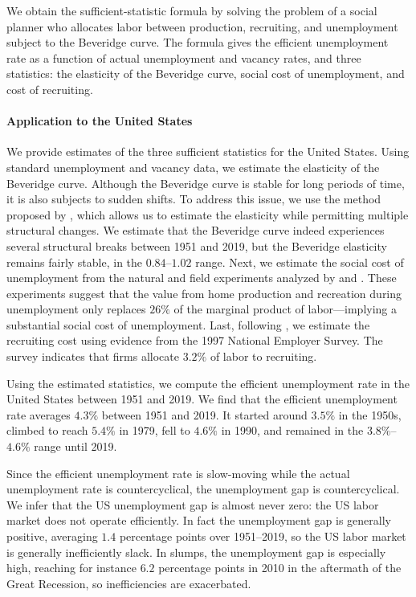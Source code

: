 \documentclass[letterpaper,12pt,leqno]{article}
\begin{document}
We obtain the sufficient-statistic formula by solving the problem of a social planner who allocates labor between production, recruiting, and unemployment subject to the Beveridge curve. The formula gives the efficient unemployment rate as a function of actual unemployment and vacancy rates, and three statistics: the elasticity of the Beveridge curve, social cost of unemployment, and cost of recruiting.

\paragraph{Application to the United States} We provide estimates of the three sufficient statistics for the United States. Using standard unemployment and vacancy data, we estimate the elasticity of the Beveridge curve. Although the Beveridge curve is stable for long periods of time, it is also subjects to sudden shifts. To address this issue, we use the method proposed by , which allows us to estimate the elasticity while permitting multiple structural changes. We estimate that the Beveridge curve indeed experiences several structural breaks between 1951 and 2019, but the Beveridge elasticity remains fairly stable, in the $0.84$--$1.02$ range. Next, we estimate the social cost of unemployment from the natural and field experiments analyzed by  and . These experiments suggest that the value from home production and recreation during unemployment only replaces $26\%$ of the marginal product of labor---implying a substantial social cost of unemployment. Last, following , we estimate the recruiting cost using evidence from the 1997 National Employer Survey. The survey indicates that firms allocate $3.2\%$ of labor to recruiting.

Using the estimated statistics, we compute the efficient unemployment rate in the United States between 1951 and 2019. We find that the efficient unemployment rate averages $4.3\%$ between 1951 and 2019. It started around $3.5\%$ in the 1950s, climbed to reach $5.4\%$ in 1979, fell to $4.6\%$ in 1990, and remained in the $3.8\%$--$4.6\%$ range until 2019.

Since the efficient unemployment rate is slow-moving while the actual unemployment rate is countercyclical, the unemployment gap is countercyclical. We infer that the US unemployment gap is almost never zero: the US labor market does not operate efficiently. In fact the unemployment gap is generally positive, averaging $1.4$ percentage points over 1951--2019, so the US labor market is generally inefficiently slack. In slumps, the unemployment gap is especially high, reaching for instance $6.2$ percentage points in 2010 in the aftermath of the Great Recession, so inefficiencies are exacerbated.
\end{document}
